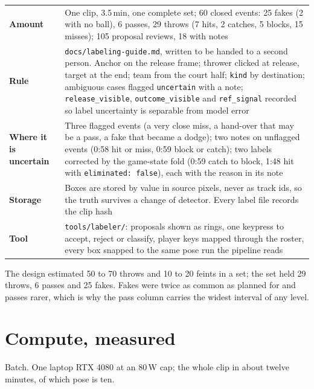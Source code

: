 \documentclass[10pt,a4paper]{article}
\begin{document}
{\footnotesize
\begin{xltabular}{\textwidth}{L{24mm} X}
\toprule
\textbf{Amount} & One clip, 3.5\,min, one complete set; 60 closed events: 25 fakes (2 with no ball), 6 passes, 29 throws (7 hits, 2 catches, 5 blocks, 15 misses); 105 proposal reviews, 18 with notes\\
\textbf{Rule} & \texttt{docs/labeling-guide.md}, written to be handed to a second person. Anchor on the release frame; thrower clicked at release, target at the end; team from the court half; \texttt{kind} by destination; ambiguous cases flagged \texttt{uncertain} with a note; \texttt{release\_visible}, \texttt{outcome\_visible} and \texttt{ref\_signal} recorded so label uncertainty is separable from model error\\
\textbf{Where it is uncertain} & Three flagged events (a very close miss, a hand-over that may be a pass, a fake that became a dodge); two notes on unflagged events (0:58 hit or miss, 0:59 block or catch); two labels corrected by the game-state fold (0:59 catch to block, 1:48 hit with \texttt{eliminated: false}), each with the reason in its note\\
\textbf{Storage} & Boxes are stored by value in source pixels, never as track ids, so the truth survives a change of detector. Every label file records the clip hash\\
\textbf{Tool} & \texttt{tools/labeler/}: proposals shown as rings, one keypress to accept, reject or classify, player keys mapped through the roster, every box snapped to the same pose run the pipeline reads\\
\bottomrule
\end{xltabular}}

The design estimated 50 to 70 throws and 10 to 20 feints in a set; the set held 29 throws,
6 passes and 25 fakes. Fakes were twice as common as planned for and passes rarer, which is
why the pass column carries the widest interval of any level.

\section{Compute, measured}
\label{sec:compute}

Batch. One laptop RTX 4080 at an 80\,W cap; the whole clip in about twelve minutes, of
which pose is ten.
\end{document}
